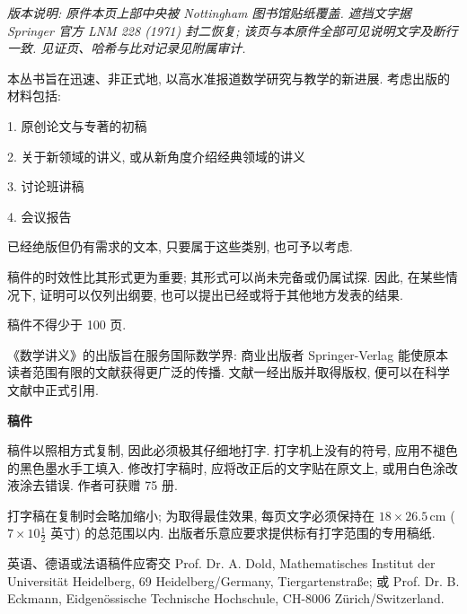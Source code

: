 \clearpage
\thispagestyle{empty}
\begingroup
\fontsize{9}{12}\selectfont
\setlength{\parindent}{0pt}\setlength{\parskip}{5pt}
\noindent\textit{版本说明: 原件本页上部中央被 Nottingham 图书馆贴纸覆盖. 遮挡文字据 Springer 官方 LNM 228 (1971) 封二恢复; 该页与本原件全部可见说明文字及断行一致. 见证页、哈希与比对记录见附属审计.}\par
本丛书旨在迅速、非正式地, 以高水准报道数学研究与教学的新进展. 考虑出版的材料包括:\par
1. 原创论文与专著的初稿\par
2. 关于新领域的讲义, 或从新角度介绍经典领域的讲义\par
3. 讨论班讲稿\par
4. 会议报告\par
已经绝版但仍有需求的文本, 只要属于这些类别, 也可予以考虑.\par
稿件的时效性比其形式更为重要; 其形式可以尚未完备或仍属试探. 因此, 在某些情况下, 证明可以仅列出纲要, 也可以提出已经或将于其他地方发表的结果.\par
稿件不得少于 100 页.\par
《数学讲义》的出版旨在服务国际数学界: 商业出版者 Springer-Verlag 能使原本读者范围有限的文献获得更广泛的传播. 文献一经出版并取得版权, 便可以在科学文献中正式引用.\par
\medskip
\textbf{稿件}\par
稿件以照相方式复制, 因此必须极其仔细地打字. 打字机上没有的符号, 应用不褪色的黑色墨水手工填入. 修改打字稿时, 应将改正后的文字贴在原文上, 或用白色涂改液涂去错误. 作者可获赠 75 册.\par
打字稿在复制时会略加缩小; 为取得最佳效果, 每页文字必须保持在 $18\times26.5\,\mathrm{cm}$ ($7\times10\frac12$ 英寸) 的总范围以内. 出版者乐意应要求提供标有打字范围的专用稿纸.\par
英语、德语或法语稿件应寄交 Prof. Dr. A. Dold, Mathematisches Institut der Universität Heidelberg, 69 Heidelberg/Germany, Tiergartenstraße; 或 Prof. Dr. B. Eckmann, Eidgenössische Technische Hochschule, CH-8006 Zürich/Switzerland.\par
\vspace{1em}

\endgroup
\clearpage
